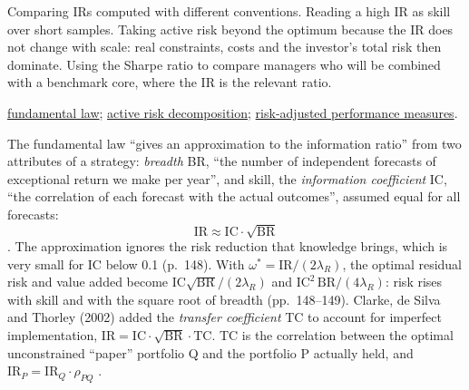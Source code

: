 \begin{qfmethod}
 Comparing IRs computed with different conventions. Reading a high IR as skill over short samples. Taking active risk beyond the optimum because the IR does not change with scale: real constraints, costs and the investor's total risk then dominate. Using the Sharpe ratio to compare managers who will be combined with a benchmark core, where the IR is the relevant ratio.

 \hyperref[res:fundamental-law-active-management]{fundamental law}; \hyperref[meth:active-risk-decomposition]{active risk decomposition}; \hyperref[meth:risk-adjusted-performance-measures]{risk-adjusted performance measures}.

\end{qfmethod}

\begin{qfresult}\label{res:fundamental-law-active-management}
 The fundamental law ``gives an approximation to the information ratio'' from two attributes of a strategy: \emph{breadth} BR, ``the number of independent forecasts of exceptional return we make per year'', and skill, the \emph{information coefficient} IC, ``the correlation of each forecast with the actual outcomes'', assumed equal for all forecasts:
\[ \text{IR}\approx\text{IC}\cdot\sqrt{\text{BR}} \]
\citep[chap.~6, pp.~147--148, eq.~(6.1)]{alpha-grinold}. The approximation ignores the risk reduction that knowledge brings, which is very small for IC below 0.1 (p.~148). With $\omega^*=\text{IR}/(2\lambda_R)$, the optimal residual risk and value added become $\text{IC}\sqrt{\text{BR}}/(2\lambda_R)$ and $\text{IC}^2\,\text{BR}/(4\lambda_R)$: risk rises with skill and with the square root of breadth (pp.~148--149). Clarke, de Silva and Thorley (2002) added the \emph{transfer coefficient} TC to account for imperfect implementation, $\text{IR}=\text{IC}\cdot\sqrt{\text{BR}}\cdot\text{TC}$. TC is the correlation between the optimal unconstrained ``paper'' portfolio Q and the portfolio P actually held, and $\text{IR}_P=\text{IR}_Q\cdot\rho_{PQ}$ \citep[chap.~3, pp.~23 and~27--28]{wide-grinold-kahn-advances}.


\end{qfresult}
